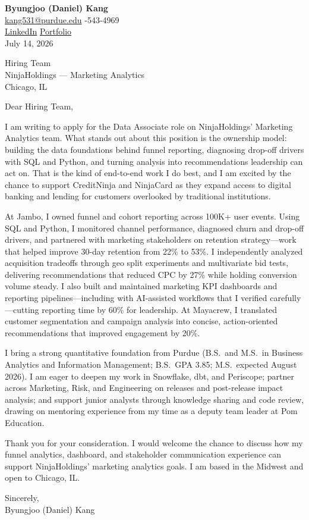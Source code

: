 \documentclass[11pt,a4paper]{article}
\begin{document}
\pagestyle{empty}

\noindent
\textbf{Byungjoo (Daniel) Kang} \\
\href{mailto:kang531@purdue.edu}{kang531@purdue.edu} -543-4969 \\
\href{https://www.linkedin.com/in/daniel-byungjoo-kang/}{LinkedIn} \quad \href{https://daniel-kang-vs.github.io}{Portfolio} \\
July 14, 2026

\vspace{12pt}
\noindent
Hiring Team \\
NinjaHoldings --- Marketing Analytics \\
Chicago, IL

\vspace{12pt}
\noindent
Dear Hiring Team,

I am writing to apply for the Data Associate role on NinjaHoldings' Marketing Analytics team. What stands out about this position is the ownership model: building the data foundations behind funnel reporting, diagnosing drop-off drivers with SQL and Python, and turning analysis into recommendations leadership can act on. That is the kind of end-to-end work I do best, and I am excited by the chance to support CreditNinja and NinjaCard as they expand access to digital banking and lending for customers overlooked by traditional institutions.

At Jambo, I owned funnel and cohort reporting across 100K+ user events. Using SQL and Python, I monitored channel performance, diagnosed churn and drop-off drivers, and partnered with marketing stakeholders on retention strategy---work that helped improve 30-day retention from 22\% to 53\%. I independently analyzed acquisition tradeoffs through geo split experiments and multivariate bid tests, delivering recommendations that reduced CPC by 27\% while holding conversion volume steady. I also built and maintained marketing KPI dashboards and reporting pipelines---including with AI-assisted workflows that I verified carefully---cutting reporting time by 60\% for leadership. At Mayacrew, I translated customer segmentation and campaign analysis into concise, action-oriented recommendations that improved engagement by 20\%.

I bring a strong quantitative foundation from Purdue (B.S.\ and M.S.\ in Business Analytics and Information Management; B.S.\ GPA 3.85; M.S.\ expected August 2026). I am eager to deepen my work in Snowflake, dbt, and Periscope; partner across Marketing, Risk, and Engineering on releases and post-release impact analysis; and support junior analysts through knowledge sharing and code review, drawing on mentoring experience from my time as a deputy team leader at Pom Education.

Thank you for your consideration. I would welcome the chance to discuss how my funnel analytics, dashboard, and stakeholder communication experience can support NinjaHoldings' marketing analytics goals. I am based in the Midwest and open to Chicago, IL.

\vspace{12pt}
\noindent
Sincerely, \\
Byungjoo (Daniel) Kang
\end{document}
